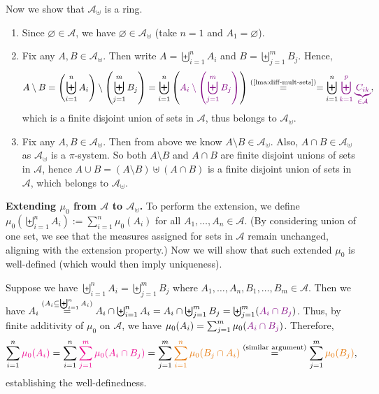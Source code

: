 \begin{enumerate}
\begin{pf}
Now we show that \(\mathcal{A}_{\uplus}\) is a ring.
\begin{enumerate}[label={(\arabic*)}]
\item Since \(\varnothing\in\mathcal{A}\), we have
\(\varnothing\in\mathcal{A}_{\uplus}\) (take \(n=1\) and \(A_1=\varnothing\)).
\item Fix any \(A,B\in\mathcal{A}_{\uplus}\). Then write
\(A=\biguplus_{i=1}^{n}A_i\) and \(B=\biguplus_{j=1}^{m}B_j\). Hence,
\[
A\setminus B=\left(\biguplus_{i=1}^{n}A_i\right)\setminus \left(\biguplus_{j=1}^{m}B_j\right)
=\biguplus_{i=1}^{n}\left(\vc{A_i\setminus \left(\biguplus_{j=1}^{m}B_j\right)}\right)
\overset{\text{(\Cref{lma:diff-mult-sets})}}{=}
=\biguplus_{i=1}^{n}\vc{\biguplus_{k=1}^{p}\underbrace{C_{ik}}_{\in\mathcal{A}}},
\]
which is a finite disjoint union of sets in \(\mathcal{A}\), thus belongs to
\(\mathcal{A}_{\uplus}\).
\item Fix any \(A,B\in\mathcal{A}_{\uplus}\). Then from above we know
\(A\setminus B\in\mathcal{A}_{\uplus}\). Also, \(A\cap
B\in\mathcal{A}_{\uplus}\) as \(\mathcal{A}_{\uplus}\) is a \(\pi\)-system.
So both \(A\setminus B\) and \(A\cap B\) are finite disjoint unions of sets in
\(\mathcal{A}\), hence \(A\cup B=(A\setminus B)\uplus(A\cap B)\) is a finite
disjoint union of sets in \(\mathcal{A}\), which belongs to \(\mathcal{A}_{\uplus}\).
\end{enumerate}
\textbf{Extending \(\mu_0\) from \(\mathcal{A}\) to \(\mathcal{A}_{\uplus}\).}
To perform the extension, we define
\(\mu_0(\biguplus_{i=1}^{n}A_i):=\sum_{i=1}^{n}\mu_0(A_i)\) for all \(A_1,\dotsc,A_n\in\mathcal{A}\).
(By considering union of one set, we see that the measures assigned for sets in
\(\mathcal{A}\) remain unchanged, aligning with the extension property.) Now we
will show that such extended \(\mu_0\) is well-defined (which would then imply
uniqueness).

Suppose we have \(\biguplus_{i=1}^{n}A_i=\biguplus_{j=1}^{m}B_j\) where \(A_1,\dotsc,A_n,B_1,\dotsc,B_m\in\mathcal{A}\).
Then we have \(A_i\overset{(A_i\subseteq \biguplus_{i=1}^{n}A_i)}{=}
A_i\cap\biguplus_{i=1}^{n}A_i=A_i\cap\biguplus_{j=1}^{m}B_j=\biguplus_{j=1}^{m}(\vc{A_i\cap
B_j})\). Thus, by finite additivity of \(\mu_0\) on \(\mathcal{A}\), we have
\(\mu_0(A_i)=\sum_{j=1}^{m}\mu_0(\vc{A_i\cap B_j})\). Therefore,
\[
\sum_{i=1}^{n}\mgc{\mu_0(A_i)}=\sum_{i=1}^{n}\mgc{\sum_{j=1}^{m}\mu_0(A_i\cap B_j)}
=\sum_{j=1}^{m}\orc{\sum_{i=1}^{n}\mu_0(B_j\cap A_i)}
\overset{\text{(similar argument)}}{=}\sum_{j=1}^{m}\orc{\mu_0(B_j)},
\]
establishing the well-definedness.


\end{pf}
\end{enumerate}
